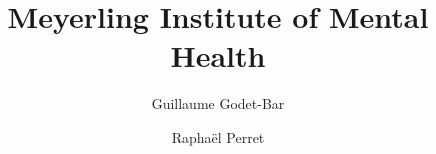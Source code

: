 \documentclass{rpg_location}
\title{Meyerling Institute of Mental Health}
\begin{document}
\author{Guillaume Godet-Bar \and Rapha\"el Perret}
\maketitle
\end{document}
